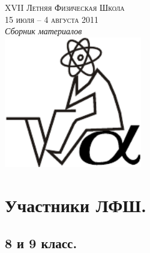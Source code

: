 \documentclass[11pt]{article}
\newlength{\h}
\newlength{\x}
\begin{document}
\thispagestyle{empty}
\parindent=5mm
\begin{center}

\phantom{Бухалкин апанас}

\vfill
\LARGE{\textsc{XVII Летняя Физическая Школа}}\\
\Large{\textsc{15 июля -- 4 августа 2011}}\\[1cm]
\Large{\textit{Сборник материалов}}\\[2cm]
\includegraphics[width=6cm]{logo.pdf}
\vfill

\end{center}

\clearpage

\section{Участники ЛФШ.}
\label{sec:participants}

\subsection{8 и 9 класс.}
\label{sec:8and9}
\end{document}
